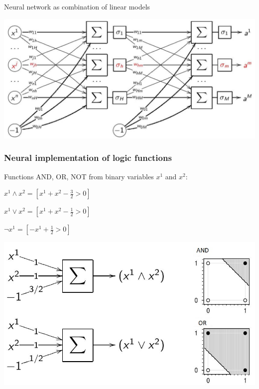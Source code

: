 \documentclass[fullscreen=true, bookmarks=true, hyperref={pdfencoding=unicode}]{beamer}
\begin{document}
\begin{frame}{Neural network as combination of linear models}
\begin{center}
  \includegraphics[keepaspectratio, width=.9\paperwidth]{nn_two_layers_cropped.jpg}
\end{center}
\end{frame}


\begin{frame}
  \frametitle{Neural implementation of logic functions}

 Functions AND, OR, NOT from binary variables $x^1$ and $x^2$:
 \begin{center}
 $x^1 \wedge x^2 = [x^1 + x^2 - \frac{3}{2} > 0]$

 $x^1 \vee x^2 = [x^1 + x^2 - \frac{1}{2} > 0]$

 $\neg x^1 = [-x^1 + \frac{1}{2} > 0]$
 \end{center}

\begin{center}
  \includegraphics[keepaspectratio, width=.6\paperwidth]{and_or.jpg}
\end{center}

\end{frame}
\end{document}
